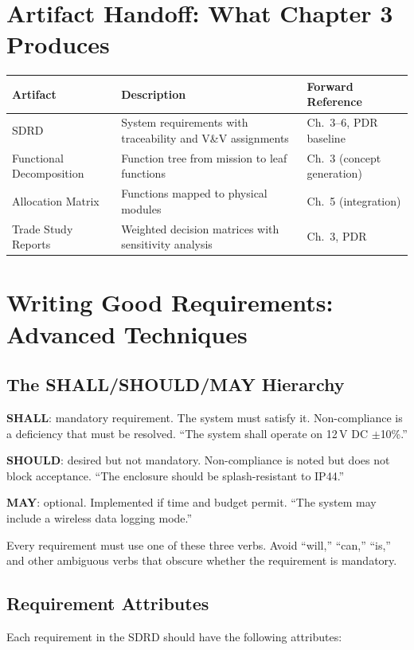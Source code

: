 \section{Artifact Handoff: What Chapter 3 Produces}
\begin{table}[htbp]\centering\small
\begin{tabularx}{\textwidth}{l X l}
\toprule
\textbf{Artifact} & \textbf{Description} & \textbf{Forward Reference} \\
\midrule
SDRD & System requirements with traceability and V\&V assignments & Ch.~3--6, PDR baseline \\
Functional Decomposition & Function tree from mission to leaf functions & Ch.~3 (concept generation) \\
Allocation Matrix & Functions mapped to physical modules & Ch.~5 (integration) \\
Trade Study Reports & Weighted decision matrices with sensitivity analysis & Ch.~3, PDR \\
\bottomrule
\end{tabularx}
\end{table}


\section{Writing Good Requirements: Advanced Techniques}
\subsection{The SHALL/SHOULD/MAY Hierarchy}
\textbf{SHALL}: mandatory requirement. The system must satisfy it. Non-compliance is a deficiency that must be resolved. ``The system shall operate on 12\,V DC $\pm$10\%.''

\textbf{SHOULD}: desired but not mandatory. Non-compliance is noted but does not block acceptance. ``The enclosure should be splash-resistant to IP44.''

\textbf{MAY}: optional. Implemented if time and budget permit. ``The system may include a wireless data logging mode.''

Every requirement must use one of these three verbs. Avoid ``will,'' ``can,'' ``is,'' and other ambiguous verbs that obscure whether the requirement is mandatory.

\subsection{Requirement Attributes}
Each requirement in the SDRD should have the following attributes:

